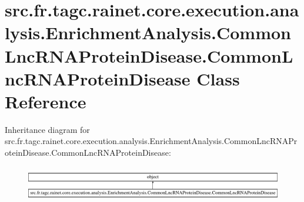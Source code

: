 \hypertarget{classsrc_1_1fr_1_1tagc_1_1rainet_1_1core_1_1execution_1_1analysis_1_1EnrichmentAnalysis_1_1Commocb4af204a9dc077e1a18361d5afc6b0c}{\section{src.\-fr.\-tagc.\-rainet.\-core.\-execution.\-analysis.\-Enrichment\-Analysis.\-Common\-Lnc\-R\-N\-A\-Protein\-Disease.\-Common\-Lnc\-R\-N\-A\-Protein\-Disease Class Reference}
\label{classsrc_1_1fr_1_1tagc_1_1rainet_1_1core_1_1execution_1_1analysis_1_1EnrichmentAnalysis_1_1Commocb4af204a9dc077e1a18361d5afc6b0c}
}
Inheritance diagram for src.\-fr.\-tagc.\-rainet.\-core.\-execution.\-analysis.\-Enrichment\-Analysis.\-Common\-Lnc\-R\-N\-A\-Protein\-Disease.\-Common\-Lnc\-R\-N\-A\-Protein\-Disease\-:\begin{figure}[H]
\begin{center}
\leavevmode
\includegraphics[height=1.521739cm]{classsrc_1_1fr_1_1tagc_1_1rainet_1_1core_1_1execution_1_1analysis_1_1EnrichmentAnalysis_1_1Commocb4af204a9dc077e1a18361d5afc6b0c}
\end{center}
\end{figure}
